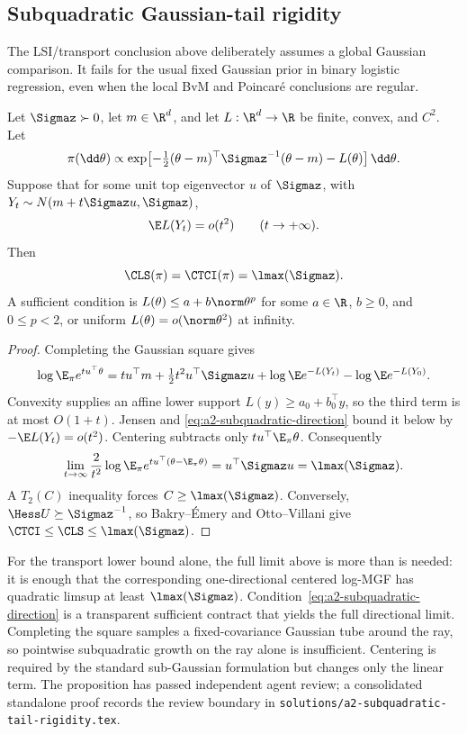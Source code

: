 \documentclass[../../main.tex]{subfiles}
\begin{document}
\subsection{Subquadratic Gaussian-tail rigidity}
\label{subsec:a2-logistic-rigidity}

The LSI/transport conclusion above deliberately assumes a global Gaussian comparison. It fails
for the usual fixed Gaussian prior in binary logistic regression, even when the local BvM and
Poincar\'e conclusions are regular.

\begin{proposition}
\label{prop:a2-subquadratic-global}
Let $\Sigmaz\succ0$, let $m\in\R^d$, and let $L:\R^d\to\R$ be finite, convex, and $C^2$. Let
\[
 \pi(\dd\theta)\propto
 \exp\!\left[-\tfrac12(\theta-m)^\top\Sigmaz^{-1}(\theta-m)-L(\theta)\right]\dd\theta.
\]
Suppose that for some unit top eigenvector $u$ of $\Sigmaz$, with
$Y_t\sim N(m+t\Sigmaz u,\Sigmaz)$,
\begin{equation}\label{eq:a2-subquadratic-direction}
  \E L(Y_t)=o(t^2)\qquad(t\to+\infty).
\end{equation}
Then
\begin{equation}\label{eq:a2-subquadratic-rigidity}
  \CLS(\pi)=\CTCI(\pi)=\lmax(\Sigmaz).
\end{equation}
A sufficient condition is $L(\theta)\le a+b\norm\theta^p$ for some $a\in\R$, $b\ge0$, and
$0\le p<2$, or uniform
$L(\theta)=o(\norm\theta^2)$ at infinity.
\end{proposition}

\begin{proof}
Completing the Gaussian square gives
\[
 \log\E_\pi e^{t u^\top\theta}
 =tu^\top m+\tfrac12t^2u^\top\Sigmaz u
  +\log\E e^{-L(Y_t)}-\log\E e^{-L(Y_0)}.
\]
Convexity supplies an affine lower support $L(y)\ge a_0+b_0^\top y$, so the third term is at most
$O(1+t)$. Jensen and \eqref{eq:a2-subquadratic-direction} bound it below by
$-\E L(Y_t)=o(t^2)$. Centering subtracts only
$t u^\top\E_\pi\theta$. Consequently
\[
 \lim_{t\to\infty}\frac2{t^2}
 \log\E_\pi e^{t u^\top(\theta-\E_\pi\theta)}
 =u^\top\Sigmaz u=\lmax(\Sigmaz).
\]
A $T_2(C)$ inequality forces $C\ge\lmax(\Sigmaz)$. Conversely,
$\Hess U\succeq\Sigmaz^{-1}$, so Bakry--\'Emery and Otto--Villani give
$\CTCI\le\CLS\le\lmax(\Sigmaz)$.
\end{proof}

For the transport lower bound alone, the full limit above is more than is needed: it is enough
that the corresponding one-directional centered log-MGF has quadratic limsup at least
$\lmax(\Sigmaz)$. Condition~\eqref{eq:a2-subquadratic-direction} is a transparent sufficient
contract that yields the full directional limit. Completing the square samples a fixed-covariance
Gaussian tube around the ray, so pointwise subquadratic growth on the ray alone is insufficient.
Centering is required by the standard sub-Gaussian formulation but changes only the linear term.
The proposition has passed independent agent review; a consolidated standalone proof records the
review boundary in \texttt{solutions/a2-subquadratic-tail-rigidity.tex}.
\end{document}
